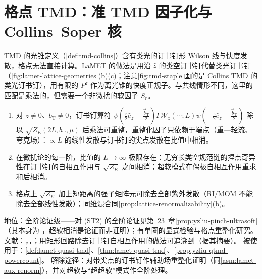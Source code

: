\section{格点 TMD：准 TMD 因子化与 Collins--Soper 核}\label{sec:lattice-tmd}

TMD 的光锥定义（\cref{def:tmd-collins}）含有类光的订书钉形 Wilson 线与快度发散，格点无法直接计算。LaMET 的做法是用沿 $\hat z$ 的类空订书钉代替类光订书钉（\cref{fig:lamet-lattice-geometries}(b)(c)；注意\cref{fig:tmd-staple}画的是 Collins TMD 的类光订书钉），用有限的 $P^z$ 作为离光锥的快度正规子。与共线情形不同，这里的匹配是乘法的，但需要一个非微扰的软因子 $S_r$。

\begin{assumption}\label{asm:lamet-staple}
\begin{enumerate}[label=(ST\arabic*),leftmargin=3.2em,itemsep=1pt,topsep=2pt]
\item 对 $z\neq0$、$b_{\mathrm T}\neq0$，订书钉算符 $\bar\psi(\frac z2\hat e_z+\frac{\vec b_{\mathrm T}}2)\Gamma\mathcal W_z(\cdots;L)\psi(-\frac z2\hat e_z-\frac{\vec b_{\mathrm T}}2)$ 除以 $\sqrt{Z_E(2L,b_{\mathrm T},\mu)}$ 后乘法可重整，重整化因子只依赖于端点（重—轻流、夸克场）：$\propto L$ 的线性发散与订书钉的尖点发散在比值中相消。
\item 在微扰论的每一阶，比值的 $L\to\infty$ 极限存在：无穷长类空规范链的捏点奇异性在订书钉的自相互作用与 $\sqrt{Z_E}$ 之间相消；超软模式在偶极自相互作用重求和后相消。
\item 格点上 $\sqrt{Z_E}$ 加上短距离的强子矩阵元可除去全部紫外发散（RI/MOM 不能除去全部线性发散）；同维混合同\cref{prop:lattice-renormalizability}(b)。
\end{enumerate}
地位：全阶论证级——对 (ST2) 的全阶论证见第~23~章\cref{prop:yzliu-pinch-ultrasoft}（其本身为 \tagA，超软相消是论证而非证明）；有单圈的显式检验与格点重整化研究。
文献：\cite{Ji:2019ewn}，\cite[第~3--4~节]{Liu:2022nnk}，\cite{Ebert:2022fmh,Ebert:2019tvc,Constantinou:2019vyb,Alexandrou:2023ucc}；用矩形回路除去订书钉自相互作用的做法可追溯到\cite{Collins:2008ht,Ji:2018hvs}（据其摘要）。
被使用于：\cref{def:lamet-quasi-tmd}、\cref{thm:lamet-quasi-tmd}、\cref{prop:yzliu-qtmd-powercount}。
解除途径：对带尖点的订书钉作辅助场重整化证明（同\cref{asm:lamet-aux-renorm}），并对超软与“超超软”模式作全阶处理。
\end{assumption}

